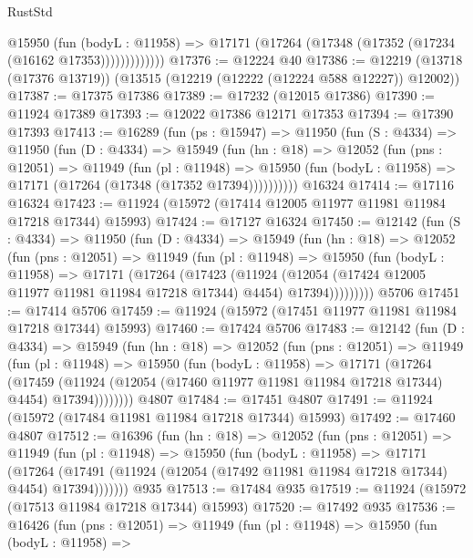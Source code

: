 \begin{lexlean}{RustStd}
\begin{coremodule}
                @15950
                  (fun (bodyL : @11958) =>
                  @17171 (@17264 (@17348 (@17352 (@17234 (@16162 @17353)))))))))))))
@17376 := @12224 @40
@17386 := @12219 (@13718 (@17376 @13719)) (@13515 (@12219 (@12222 (@12224 @588 @12227)) @12002))
@17387 := @17375 @17386
@17389 := @17232 (@12015 @17386)
@17390 := @11924 @17389
@17393 := @12022 @17386 @12171 @17353
@17394 := @17390 @17393
@17413 := @16289
    (fun (ps : @15947) =>
    @11950
      (fun (S : @4334) =>
      @11950
        (fun (D : @4334) =>
        @15949
          (fun (hn : @18) =>
          @12052
            (fun (pns : @12051) =>
            @11949
              (fun (pl : @11948) =>
              @15950 (fun (bodyL : @11958) => @17171 (@17264 (@17348 (@17352 @17394))))))))))
    @16324
@17414 := @17116 @16324
@17423 := @11924 (@15972 (@17414 @12005 @11977 @11981 @11984 @17218 @17344) @15993)
@17424 := @17127 @16324
@17450 := @12142
    (fun (S : @4334) =>
    @11950
      (fun (D : @4334) =>
      @15949
        (fun (hn : @18) =>
        @12052
          (fun (pns : @12051) =>
          @11949
            (fun (pl : @11948) =>
            @15950
              (fun (bodyL : @11958) =>
              @17171
                (@17264
                  (@17423
                    (@11924
                      (@12054 (@17424 @12005 @11977 @11981 @11984 @17218 @17344) @4454)
                      @17394)))))))))
    @5706
@17451 := @17414 @5706
@17459 := @11924 (@15972 (@17451 @11977 @11981 @11984 @17218 @17344) @15993)
@17460 := @17424 @5706
@17483 := @12142
    (fun (D : @4334) =>
    @15949
      (fun (hn : @18) =>
      @12052
        (fun (pns : @12051) =>
        @11949
          (fun (pl : @11948) =>
          @15950
            (fun (bodyL : @11958) =>
            @17171
              (@17264
                (@17459
                  (@11924 (@12054 (@17460 @11977 @11981 @11984 @17218 @17344) @4454) @17394))))))))
    @4807
@17484 := @17451 @4807
@17491 := @11924 (@15972 (@17484 @11981 @11984 @17218 @17344) @15993)
@17492 := @17460 @4807
@17512 := @16396
    (fun (hn : @18) =>
    @12052
      (fun (pns : @12051) =>
      @11949
        (fun (pl : @11948) =>
        @15950
          (fun (bodyL : @11958) =>
          @17171
            (@17264
              (@17491 (@11924 (@12054 (@17492 @11981 @11984 @17218 @17344) @4454) @17394)))))))
    @935
@17513 := @17484 @935
@17519 := @11924 (@15972 (@17513 @11984 @17218 @17344) @15993)
@17520 := @17492 @935
@17536 := @16426
    (fun (pns : @12051) =>
    @11949
      (fun (pl : @11948) =>
      @15950
        (fun (bodyL : @11958) =>

\end{coremodule}
\end{lexlean}
